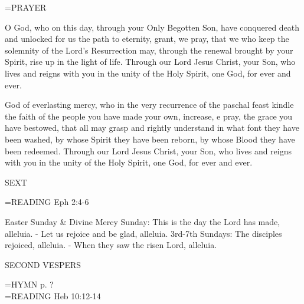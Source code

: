 \hangindent=\parindent \small PRAYER
\begin{description}[labelindent=\parindent, noitemsep, leftmargin=*]
\item [Easter Sunday:] 	O God, who on this day, through your Only Begotten Son, have conquered death and unlocked for us the path to eternity, grant, we pray, that we who keep the solemnity of the Lord's Resurrection may, through the renewal brought by your Spirit, rise up in the light of life. Through our Lord Jesus Christ, your Son, who lives and reigns with you in the unity of the Holy Spirit, one God, for ever and ever.
\item [Divine Mercy Sunday:] 	God of everlasting mercy, who in the very recurrence of the paschal feast kindle the faith of the people you have made your own, increase, e pray, the grace you have bestowed, that all may grasp and rightly understand in what font they have been washed, by whose Spirit they have been reborn, by whose Blood they have been redeemed. Through our Lord Jesus Christ, your Son, who lives and reigns with you in the unity of the Holy Spirit, one God, for ever and ever.
\item [3rd Sunday:] 		
\item [4th Sunday:] 		
\item [5th Sunday:] 		
\item [6th Sunday:] 		
\item [7th Sunday:] 	
\end{description}

\begin{flushleft}\normalsize SEXT\\\end{flushleft}
\hangindent=\parindent \small{READING}    Eph 2:4-6 \textbf{   }

Easter Sunday \& Divine Mercy Sunday:	This is the day the Lord has made, alleluia.
						- Let us rejoice and be glad, alleluia.
3rd-7th Sundays:	The disciples rejoiced, alleluia.
			- When they saw the risen Lord, alleluia.

\begin{flushleft}\normalsize SECOND VESPERS\\\end{flushleft}
\hangindent=\parindent \small{\uppercase{HYMN} p.  ?\\}
\hangindent=\parindent \small{READING}    Heb 10:12-14 \textbf{   \\}

